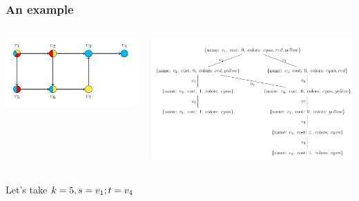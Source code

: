 \documentclass[usenames,dvipsnames,fleqn]{beamer}
\begin{document}
\begin{frame}
    \frametitle{An example}
  
    \begin{columns}
      \begin{column}{0.40\textwidth}
        \includegraphics[width=1\textwidth]{img/Screenshot_4.png}
      \end{column}
      \begin{column}{0.59\textwidth}
        \includegraphics[width=1\textwidth]{img/Screenshot_5.png}
      \end{column}
    \end{columns}
  
    Let's take $k = 5, s = v_1; t = v_4$
  
  \end{frame}
  
\end{document}
